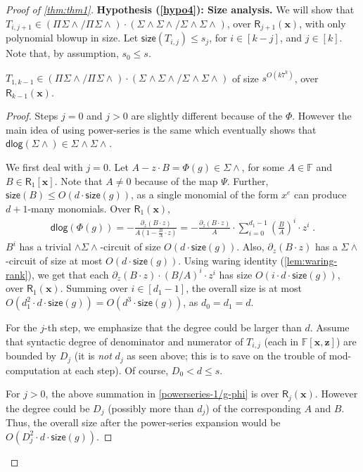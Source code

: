 \documentclass[10pt,a4paper]{article}
\newcommand{\F}{\mathbb{F}}
\newcommand{\ringR}{\mathsf{R}}
\newcommand{\x}{{\boldsymbol x}}
\newcommand{\z}{{\boldsymbol z}}
\newcommand{\dlg}{\mathsf{dlog}}
\newcommand{\size}{\mathsf{size}}
\newcommand{\PSU}[2]{\Pi^{#1} \Sigma\wedge^{#2}}
\newcommand{\WSU}[1]{\wedge\Sigma \wedge^{#1}}
\newcommand{\SWSU}[2]{\Sigma^{#1}\!\wedge\!\Sigma\!\wedge^{#2}}
\numberwithin{equation}{section}
\begin{document}
\begin{proof}[Proof of \autoref{thm:thm1}]
%

\smallskip
\noindent \textbf{Hypothesis (\ref{hypo4}): Size analysis.} We will show that $T_{i,j+1} \in (\PSU{}{}/\PSU{}{}) \cdot (\SWSU{}{}/\SWSU{}{})$, over $\ringR_{j+1}(\x)$, with only polynomial blowup in size.  Let $\size(T_{i,j}) \le s_j$, for $i \in [k-j]$, and $j \in [k]$. Note that, by assumption, $s_0 \le s$.

\begin{claim} \label{cl:size-bound-on-Ti}
$T_{1,k-1} \in (\PSU{}{}/\PSU{}{}) \cdot (\SWSU{}{}/\SWSU{}{})$ of size $s^{O(k7^k)}$, over $\ringR_{k-1}(\x)$.
\end{claim}

\begin{proof}
Steps $j=0$ and $j>0$ are slightly different because of the $\Phi$. However the main idea of using power-series is the same which eventually shows that $\dlg(\Sigma \wedge) \in \SWSU{}{}{}$. 

We first deal with $j=0$. Let $A-z \cdot B= \Phi(g) \in \Sigma \wedge$, for some $A \in \F$ and $B \in \ringR_1[\x]$. Note that $A \ne 0$ because of the map $\Psi$. Further, $\size(B) \le O(d \cdot \size(g))$, as a single monomial of the form $x^e$ can produce $d+1$-many monomials. Over $\ringR_1(\x)$,
\begin{align}
    \dlg(\Phi(g)) = -\frac{\partial_{z}(B\cdot z)}{A(1- \frac{B}{A}\cdot z)}  = -\frac{\partial_{z}(B\cdot z)}{A} \cdot \sum_{i=0}^{d_1-1} \left(\frac{B}{A}\right)^{i} \cdot z^i\;. \label{powerseries-1/g-phi}
\end{align}
$B^i$ has a trivial $\WSU{}$-circuit of size $O(d \cdot \size(g))$.  Also, $\partial_{z}(B\cdot z)$ has a $\Sigma \wedge$-circuit of size at most $O(d\cdot \size(g))$. Using waring identity (\autoref{lem:waring-rank}), we get that each $\partial_{z}(B\cdot z) \cdot (B/A)^i \cdot z^i$ has size $O(i\cdot d \cdot \size(g))$, over $\ringR_1(\x)$. Summing over $i \in [d_1-1]$, the overall size is at most $ O(d_1^2\cdot d \cdot \size(g))=O(d^3 \cdot \size(g))$, as $d_0=d_1=d$. 

For the $j$-th step, we emphasize that the degree could be larger than $d$. Assume that syntactic degree of denominator and numerator of $T_{i,j}$ (each in $\F[\x,\z]$) are bounded by $D_{j}$ (it is {\em not} $d_j$ as seen above; this is to save on the trouble of mod-computation at each step). Of course, $D_0<d \le s$. 

For $j>0$, the above summation in \autoref{powerseries-1/g-phi} is over $\ringR_{j}(\x)$. However the degree could be $D_j$ (possibly more than $d_j$) of the corresponding $A$ and $B$. Thus, the overall size after the power-series expansion would be $O(D_j^2 \cdot d \cdot \size(g))$. 


\end{proof}
\end{proof}
\end{document}

